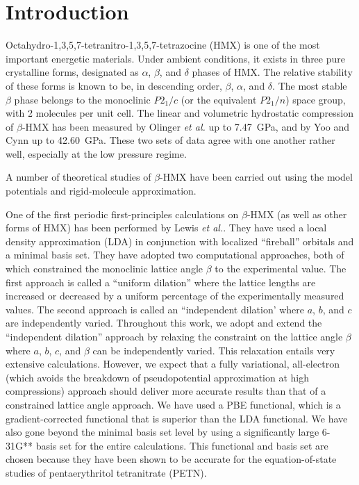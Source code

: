 \commentoutA{\documentclass[prl,aps,twocolumn,twocolumngrid,superbib]{revtex4}}
\begin{document}


\section{Introduction}
\label{sec:intro}
Octahydro-1,3,5,7-tetranitro-1,3,5,7-tetrazocine (HMX) is one of the
most important energetic materials. Under ambient conditions, it
exists in three pure crystalline forms, designated as $\alpha$,
$\beta$, and $\delta$ phases of HMX. The relative stability of these
forms is known to be, in descending order, $\beta$, $\alpha$, and
$\delta$.  The most stable $\beta$ phase belongs to the monoclinic
$P2_1/c$ (or the equivalent $P2_1/n$) space group, with 2 molecules
per unit cell\cite{CChoi72}.  The linear and volumetric hydrostatic
compression of $\beta$-HMX has been measured by Olinger {\it et
al.}\cite{BOlinger78} up to 7.47~GPa, and by Yoo and
Cynn\cite{Yoo98,Yoo_1999v111} up to 42.60~GPa. These two sets of data
agree with one another rather well, especially at the low pressure
regime.

A number of theoretical studies of $\beta$-HMX have been carried out
using the model potentials and rigid-molecule
approximation\cite{DSorescu98,TSewell98,DSorescu99,TSewell03}.

One of the first periodic first-principles calculations on $\beta$-HMX
(as well as other forms of HMX) has been performed by Lewis {\it et
al.}\cite{JPLewis00}. They have used a local density approximation
(LDA) in conjunction with localized ``fireball'' orbitals and a
minimal basis set. They have adopted two computational approaches,
both of which constrained the monoclinic lattice angle $\beta$ to the
experimental value. The first approach is called a ``uniform
dilation'' where the lattice lengths are increased or decreased by a
uniform percentage of the experimentally measured values. The second
approach is called an ``independent dilation' where $a$, $b$, and $c$
are independently varied. Throughout this work, we adopt and extend
the ``independent dilation'' approach by relaxing the constraint on
the lattice angle $\beta$ where $a$, $b$, $c$, and $\beta$ can be
independently varied.  This relaxation entails very extensive
calculations. However, we expect that a fully variational,
all-electron (which avoids the breakdown of pseudopotential
approximation at high compressions) approach should deliver more
accurate results than that of a constrained lattice angle approach. We
have used a PBE functional\cite{Perdew_96v77}, which is a
gradient-corrected functional that is superior than the LDA
functional.  We have also gone beyond the minimal basis set level by
using a significantly large 6-31G** basis set for the entire
calculations. This functional and basis set are chosen because they
have been shown to be accurate for the equation-of-state studies of
pentaerythritol tetranitrate (PETN)\cite{CGan04A}.
\end{document}
